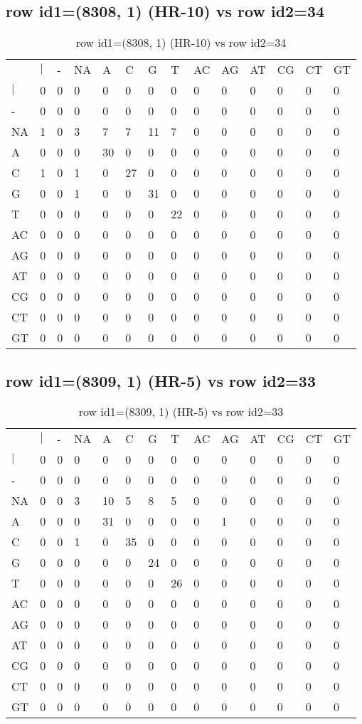 \subsection{row id1=(8308, 1) (HR-10) vs row id2=34}
\begin{center}
\begin{longtable}{|l|l|l|l|l|l|l|l|l|l|l|l|l|l|}
\caption{row id1=(8308, 1) (HR-10) vs row id2=34} \label{table_dm490}\\
\hline
\\
\hline
&$|$&-&NA&A&C&G&T&AC&AG&AT&CG&CT&GT\\
$|$&0&0&0&0&0&0&0&0&0&0&0&0&0\\
-&0&0&0&0&0&0&0&0&0&0&0&0&0\\
NA&1&0&3&7&7&11&7&0&0&0&0&0&0\\
A&0&0&0&30&0&0&0&0&0&0&0&0&0\\
C&1&0&1&0&27&0&0&0&0&0&0&0&0\\
G&0&0&1&0&0&31&0&0&0&0&0&0&0\\
T&0&0&0&0&0&0&22&0&0&0&0&0&0\\
AC&0&0&0&0&0&0&0&0&0&0&0&0&0\\
AG&0&0&0&0&0&0&0&0&0&0&0&0&0\\
AT&0&0&0&0&0&0&0&0&0&0&0&0&0\\
CG&0&0&0&0&0&0&0&0&0&0&0&0&0\\
CT&0&0&0&0&0&0&0&0&0&0&0&0&0\\
GT&0&0&0&0&0&0&0&0&0&0&0&0&0\\
\hline
\end{longtable}
\end{center}

\subsection{row id1=(8309, 1) (HR-5) vs row id2=33}
\begin{center}
\begin{longtable}{|l|l|l|l|l|l|l|l|l|l|l|l|l|l|}
\caption{row id1=(8309, 1) (HR-5) vs row id2=33} \label{table_dm492}\\
\hline
\\
\hline
&$|$&-&NA&A&C&G&T&AC&AG&AT&CG&CT&GT\\
$|$&0&0&0&0&0&0&0&0&0&0&0&0&0\\
-&0&0&0&0&0&0&0&0&0&0&0&0&0\\
NA&0&0&3&10&5&8&5&0&0&0&0&0&0\\
A&0&0&0&31&0&0&0&0&1&0&0&0&0\\
C&0&0&1&0&35&0&0&0&0&0&0&0&0\\
G&0&0&0&0&0&24&0&0&0&0&0&0&0\\
T&0&0&0&0&0&0&26&0&0&0&0&0&0\\
AC&0&0&0&0&0&0&0&0&0&0&0&0&0\\
AG&0&0&0&0&0&0&0&0&0&0&0&0&0\\
AT&0&0&0&0&0&0&0&0&0&0&0&0&0\\
CG&0&0&0&0&0&0&0&0&0&0&0&0&0\\
CT&0&0&0&0&0&0&0&0&0&0&0&0&0\\
GT&0&0&0&0&0&0&0&0&0&0&0&0&0\\
\hline
\end{longtable}
\end{center}

